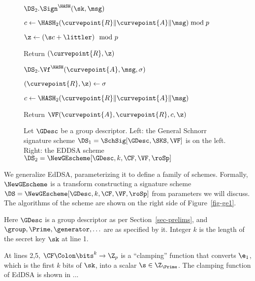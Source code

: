 \begin{figure}
{\begin{algorithm-subsequent}{$\DS_2.\Sign^{\HASH}(\sk, \msg)$}
		\item $c \gets \HASH_2(\curvepoint{R}\|\curvepoint{A}\|\msg) \bmod p$
		\item $\z \gets (\s c + \littler) \mod p$
		\item Return $(\curvepoint{R},\z)$
	\end{algorithm-subsequent}
	\begin{algorithm-subsequent}{$\DS_2.\Vf^{\HASH}(\curvepoint{A}, \msg, \sigma)$}
		\item $(\curvepoint{R}, \z) \gets \sigma$
		\item $c \gets \HASH_2(\curvepoint{R}\|\curvepoint{A}\|\msg)$
		\item Return $\VF(\curvepoint{A},\curvepoint{R},c,\z)$
	\end{algorithm-subsequent}  \vspace{2pt}
	}
\vspace{-8pt}
\caption{Let $\GDesc$ be a group descriptor. Left: the General Schnorr signature scheme $\DS_1 = \SchSig[\GDesc,\SKS,\VF]$ is on the left. Right: the EDDSA scheme $\DS_2 = \NewGEscheme[\GDesc,k, \CF,\VF,\roSp]$}
\label{fig-ge1}\label{fig-schnorr}
\hrulefill
\vspace{-10pt}
\end{figure}

 We generalize EdDSA, parameterizing it to define a family of schemes. Formally, $\NewGEscheme$ is a transform constructing a signature scheme $\DS = \NewGEscheme[\GDesc,k, \CF,\VF,\roSp]$ from parameters we will discuss. The algorithms of the scheme are shown on the right side of Figure~\ref{fig-ge1}. 

Here $\GDesc$ is a group descriptor as per Section~\ref{sec-prelims}, and $\group,\Prime,\generator,\ldots$ are as specified by it. Integer $k$ is the length of the secret key $\sk$ at line 1. 

 At lines 2,5, $\CF \Colon \bits^k\to \Z_p$ is a ``clamping'' function that converts $\e_1$, which is the first $k$ bits of $\sk$, into a scalar $\s\in\Z_{\Prime}$. The clamping function of EdDSA is shown in ... 


